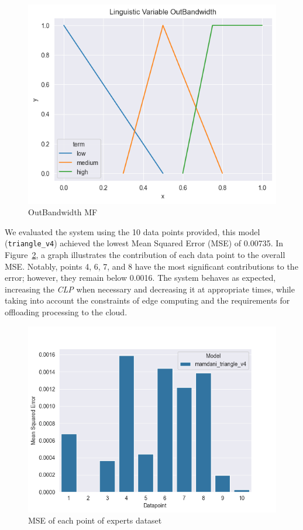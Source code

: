 \documentclass[titlepage]{article}
\begin{document}
\begin{figure}[H]
    \centering
\includegraphics[scale = 0.6]{../images/triangular_v4_OutBandwidth}
\caption{OutBandwidth MF}
\label{fig:bandwidth_triangular_v4}
\end{figure}


We evaluated the system using the 10 data points provided, this model (\texttt{triangle\_v4}) achieved the lowest Mean Squared Error (MSE) of 0.00735.
In Figure~\ref{fig:MSE_triangle_v4.png}, a graph illustrates the contribution of each data point to the overall MSE. Notably, points 4, 6, 7, and 8 have the most significant contributions to the error; however, they remain below 0.0016.
The system behaves as expected, increasing the \textit{CLP} when necessary and decreasing it at appropriate times, while taking into account the constraints of edge computing and the requirements for offloading processing to the cloud.

\begin{figure}[H]
    \centering
\includegraphics[scale = 0.5]{../images/MSE_triangle_v4}
\caption{MSE of each point of experts dataset}
\label{fig:MSE_triangle_v4.png}
\end{figure}
\end{document}
